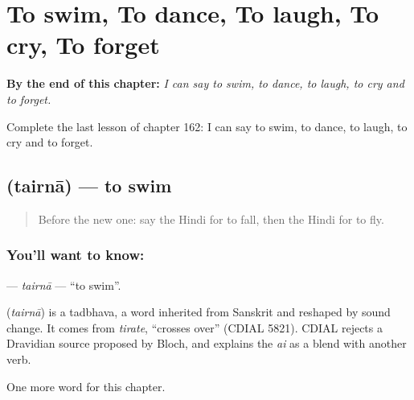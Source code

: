 
\chapter{To swim, To dance, To laugh, To cry, To forget}
\label{ch:hi-to-swim-to-dance-to-laugh-to-cry-to-forget}

\begin{chapteropening}
\textbf{By the end of this chapter:} \emph{I can say to swim, to dance, to laugh, to cry and to forget.}

Complete the last lesson of chapter 162: I can say to swim, to dance, to laugh, to cry and to forget.
\end{chapteropening}

\section[\texorpdfstring{\hi{तैरना} (tairnā)}{तैरना (tairnā)}]{ (tairnā) — to swim}

\label{lesson:HI-C162-tairna}



\begin{quote}
Before the new one: say the Hindi for to fall, then the Hindi for to fly.
\end{quote}

\subsection*{You'll want to know: }
\textbf{} — \emph{tairnā} — \textquotedblleft{}to swim\textquotedblright{}.

\begin{cousinweb}
\textbf{} (\emph{tairnā}) is a tadbhava, a word inherited from Sanskrit and reshaped by sound change. It comes from \emph{tirate}, \textquotedblleft{}crosses over\textquotedblright{} (CDIAL 5821). CDIAL rejects a Dravidian source proposed by Bloch, and explains the \emph{ai} as a blend with another verb.
\end{cousinweb}

\begin{grammarlens}[title={What you've built}]
One more word for this chapter.
\end{grammarlens}

